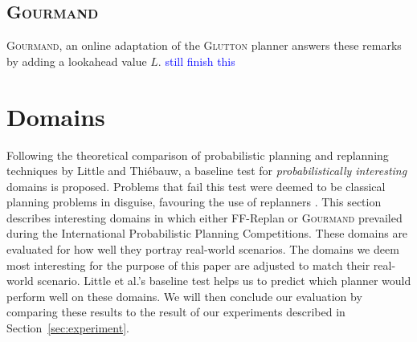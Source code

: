 \documentclass[runningheads,a4paper]{llncs}
\newcommand\todo[1]{\textcolor{blue}{#1}}
\begin{document}
\subsection{\textsc{Gourmand}}
\textsc{Gourmand}, an online adaptation of the \textsc{Glutton} planner answers these remarks by adding a lookahead value $L$. \todo{still finish this}




\section{Domains}
Following the theoretical comparison of probabilistic planning and replanning techniques by Little and Thi\'ebauw, a baseline test for \emph{probabilistically interesting} domains is proposed. Problems that fail this test were deemed to be classical planning problems in disguise, favouring the use of replanners \cite{little2007probvsreplan}. This section describes interesting domains in which either FF-Replan or \textsc{Gourmand} prevailed during the International Probabilistic Planning Competitions. These domains are evaluated for how well they portray real-world scenarios. The domains we deem most interesting for the purpose of this paper are adjusted to match their real-world scenario. Little et al.'s baseline test helps us to predict which planner would perform well on these domains. We will then conclude our evaluation by comparing these results to the result of our experiments described in Section~\ref{sec:experiment}.
\end{document}
